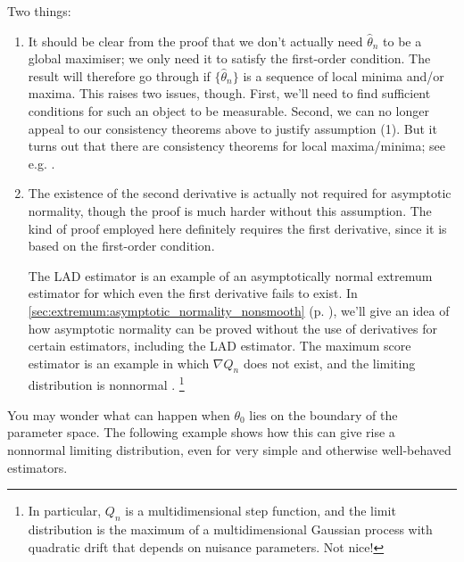 \documentclass[11pt,letterpaper,reqno,oneside]{article}
\begin{document}
\begin{remark}
	Two things:
	\begin{enumerate}

		\item It should be clear from the proof that we don't actually need $\widehat{\theta}_n$ to be a global maximiser; we only need it to satisfy the first-order condition. The result will therefore go through if $\bigl\{ \widehat{\theta}_n \bigr\}$ is a sequence of local minima and/or maxima. This raises two issues, though. First, we'll need to find sufficient conditions for such an object to be measurable. Second, we can no longer appeal to our consistency theorems above to justify assumption (1). But it turns out that there are consistency theorems for local maxima/minima; see e.g. \textcite[][Theorem 4.1.2]{Amemiya1985}.

		\item The existence of the second derivative is actually not required for asymptotic normality, though the proof is much harder without this assumption. The kind of proof employed here definitely requires the first derivative, since it is based on the first-order condition.

		The LAD estimator is an example of an asymptotically normal extremum estimator for which even the first derivative fails to exist. In \cref{sec:extremum:asymptotic_normality_nonsmooth} (p. \pageref{sec:extremum:asymptotic_normality_nonsmooth}), we'll give an idea of how asymptotic normality can be proved without the use of derivatives for certain estimators, including the LAD estimator. The maximum score estimator \parencite{Manski1975} is an example in which $\nabla Q_n$ does not exist, and the limiting distribution is nonnormal \parencite{KimPollard1990}.%
			\footnote{In particular, $Q_n$ is a multidimensional step function, and the limit distribution is the maximum of a multidimensional Gaussian process with quadratic drift that depends on nuisance parameters. Not nice!}

	\end{enumerate}
\end{remark}


You may wonder what can happen when $\theta_0$ lies on the boundary of the parameter space. The following example shows how this can give rise a nonnormal limiting distribution, even for very simple and otherwise well-behaved estimators.
\end{document}
